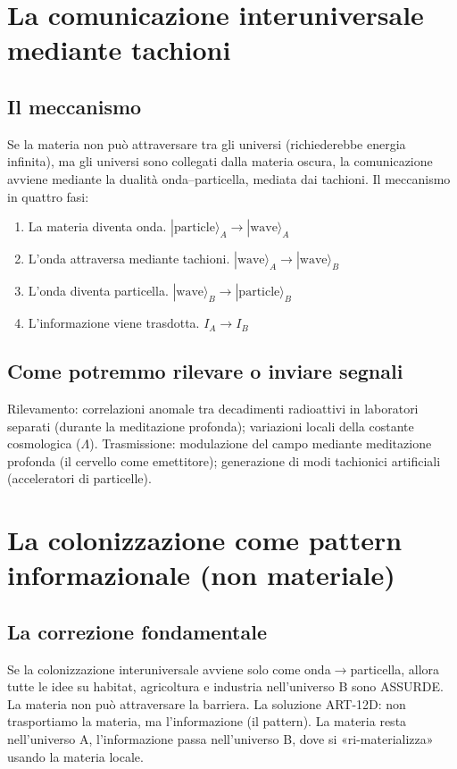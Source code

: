 \section{La comunicazione interuniversale mediante tachioni}
\subsection{Il meccanismo}
Se la materia non può attraversare tra gli universi (richiederebbe energia infinita), ma gli universi sono collegati dalla materia oscura, la comunicazione avviene mediante la dualità onda--particella, mediata dai tachioni. Il meccanismo in quattro fasi:
\begin{enumerate}
    \item La materia diventa onda. $|\text{particle}\rangle_A \to |\text{wave}\rangle_A$
    \item L'onda attraversa mediante tachioni. $|\text{wave}\rangle_A \to |\text{wave}\rangle_B$
    \item L'onda diventa particella. $|\text{wave}\rangle_B \to |\text{particle}\rangle_B$
    \item L'informazione viene trasdotta. $I_A \to I_B$
\end{enumerate}

\subsection{Come potremmo rilevare o inviare segnali}
Rilevamento: correlazioni anomale tra decadimenti radioattivi in laboratori separati (durante la meditazione profonda); variazioni locali della costante cosmologica ($\Lambda$). Trasmissione: modulazione del campo mediante meditazione profonda (il cervello come emettitore); generazione di modi tachionici artificiali (acceleratori di particelle).

\section{La colonizzazione come pattern informazionale (non materiale)}
\subsection{La correzione fondamentale}
Se la colonizzazione interuniversale avviene solo come onda$\to$particella, allora tutte le idee su habitat, agricoltura e industria nell'universo B sono ASSURDE. La materia non può attraversare la barriera. La soluzione ART-12D: non trasportiamo la materia, ma l'informazione (il pattern). La materia resta nell'universo A, l'informazione passa nell'universo B, dove si «ri-materializza» usando la materia locale.

